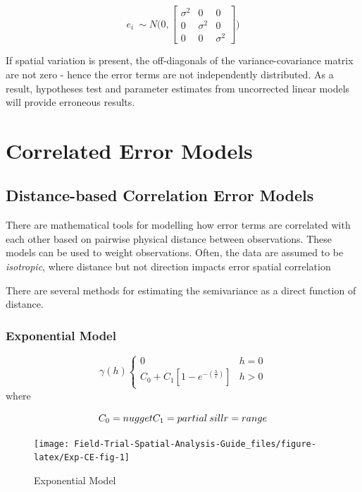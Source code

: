 \documentclass[]{book}
\begin{document}
\[e_i ~\sim N \Bigg( 0, 
\left[ {\begin{array}{ccc} \sigma^2 & 0 & 0 \\ 0 & \sigma^2 & 0\\ 0 & 0 & \sigma^2\end{array}  } \right] \Bigg) \]

If spatial variation is present, the off-diagonals of the variance-covariance matrix are not zero - hence the error terms are not independently distributed. As a result, hypotheses test and parameter estimates from uncorrected linear models will provide erroneous results.

\hypertarget{correlated-error-models}{%
\section{Correlated Error Models}\label{correlated-error-models}}

\hypertarget{distance-based-correlation-error-models}{%
\subsection{Distance-based Correlation Error Models}\label{distance-based-correlation-error-models}}

There are mathematical tools for modelling how error terms are correlated with each other based on pairwise physical distance between observations. These models can be used to weight observations. Often, the data are assumed to be \emph{isotropic}, where distance but not direction impacts error spatial correlation

There are several methods for estimating the semivariance as a direct function of distance.

\hypertarget{exponential-model}{%
\subsubsection{Exponential Model}\label{exponential-model}}

\[ \gamma (h)\left\{ {\begin{array}{cc} 0 & h = 0\\ C_0+C_1 \left [ 1-e^{-(\frac{h}{r})} \right] & h > 0 \end{array} } \right. \]
where

\[ C_0 = nugget \\ C_1 = partial \: sill \\ r = range\]

\begin{figure}

{\centering \texttt{[image: Field-Trial-Spatial-Analysis-Guide\_files/figure-latex/Exp-CE-fig-1]} 

}

\caption{Exponential Model}\label{fig:Exp-CE-fig}
\end{figure}
\end{document}
